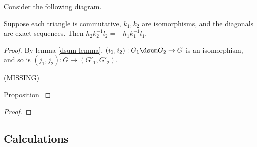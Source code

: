 \begin{lemma}
Consider the following diagram.
Suppose each triangle is commutative, $k_1,k_2$ are isomorphisms, and the diagonals are exact sequences. Then $h_2k_2^{-1}l_2=-h_1k_1^{-1}l_1$.
\end{lemma}

\begin{proof}By lemma \ref{dsum-lemma}, $(i_1,i_2):G_1\dsum G_2\rightarrow G$ is an isomorphism, and so is $(j_1,j_2):G\rightarrow(G'_1,G'_2)$.

(MISSING)

Proposition \cite{direct-sum} 
\cite{Hatcher}
\end{proof}

\begin{theorem}

\end{theorem}
\begin{proof}
\end{proof}
\subsection{Calculations}

